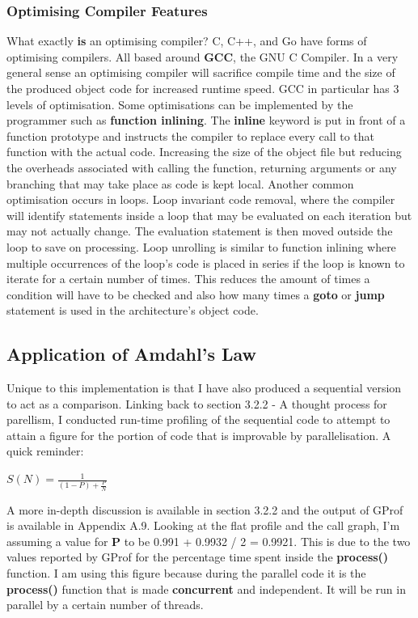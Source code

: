 \documentclass[11pt]{article} %
\begin{document}
\subsubsection{Optimising Compiler Features}
What exactly {\bf is} an optimising compiler? C, C++, and Go have forms of optimising compilers. All based around {\bf GCC}, the GNU C Compiler. In a very general sense an optimising compiler will sacrifice compile time and the size of the produced object code for increased runtime speed. GCC in particular has 3 levels of optimisation. Some optimisations can be implemented by the programmer such as {\bf function inlining}. The {\bf inline} keyword is put in front of a function prototype and instructs the compiler to replace every call to that function with the actual code. Increasing the size of the object file but reducing the overheads associated with calling the function, returning arguments or any branching that may take place as code is kept local. Another common optimisation occurs in loops. Loop invariant code removal, where the compiler will identify statements inside a loop that may be evaluated on each iteration but may not actually change. The evaluation statement is then moved outside the loop to save on processing. Loop unrolling is similar to function inlining where multiple occurrences of the loop's code is placed in series if the loop is known to iterate for a certain number of times. This reduces the amount of times a condition will have to be checked and also how many times a {\bf goto} or {\bf jump} statement is used in the architecture's object code.
\subsection{Application of Amdahl's Law}
Unique to this implementation is that I have also produced a sequential version to act as a comparison. Linking back to section 3.2.2 - A thought process for parellism, I conducted run-time profiling of the sequential code to attempt to attain a figure for the portion of code that is improvable by parallelisation. A quick reminder:\\
\smallskip
\centerline{$ S(N) = \frac{1}{(1-P) + \frac{P}{N}} $}

A more in-depth discussion is available in section 3.2.2 and the output of GProf is available in Appendix A.9. Looking at the flat profile and the call graph, I'm assuming a value for {\bf P} to be 0.991 + 0.9932 / 2 = 0.9921. This is due to the two values reported by GProf for the percentage time spent inside the {\bf process()} function. I am using this figure because during the parallel code it is the {\bf process()} function that is made {\bf concurrent} and independent. It will be run in parallel by a certain number of threads.
\end{document}
